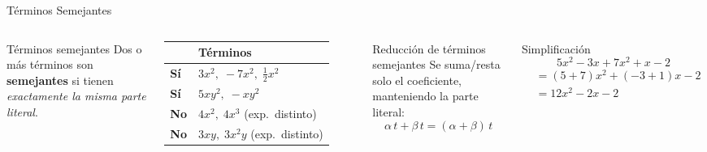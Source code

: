 \documentclass[12pt,aspectratio=169]{beamer}
\begin{document}
\begin{frame}{T\'erminos Semejantes}
  \begin{columns}[T]
    \begin{cdef}{T\'erminos semejantes}
      Dos o m\'as t\'erminos son \textbf{semejantes} si tienen
      \emph{exactamente la misma parte literal}.
    \end{cdef}
    \vspace{5pt}
    \renewcommand{\arraystretch}{1.4}
    \begin{tabular}{>{\bfseries}ll}
      \toprule
      & T\'erminos\\\midrule
      \textcolor{verde}{S\'i} & $3x^{2},\;-7x^{2},\;\tfrac{1}{2}x^{2}$\\
      \textcolor{verde}{S\'i} & $5xy^{2},\;-xy^{2}$\\
      \textcolor{red!70!black}{No} & $4x^{2},\;4x^{3}$ (exp.\ distinto)\\
      \textcolor{red!70!black}{No} & $3xy,\;3x^{2}y$ (exp.\ distinto)\\
      \bottomrule
    \end{tabular}

    \begin{cprop}{Reducci\'on de t\'erminos semejantes}
      Se suma/resta solo el coeficiente, manteniendo la parte literal:
      \[\alpha\,t+\beta\,t=(\alpha+\beta)\,t\]
    \end{cprop}
    \vspace{5pt}
    \begin{cejec}{Simplificaci\'on}
      \small
      \[5x^{2}-3x+7x^{2}+x-2\]
      \begin{align*}
        &=(5+7)x^{2}+(-3+1)x-2\\
        &=\boxed{12x^{2}-2x-2}
      \end{align*}
    \end{cejec}
  \end{columns}
\end{frame}
\end{document}
